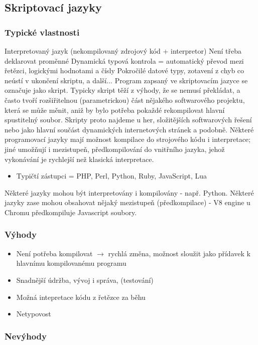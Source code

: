 \documentclass[10pt,a4paper]{article}
\begin{document}
\subsection{Skriptovací jazyky}
\subsubsection{Typické vlastnosti}Interpretovaný jazyk (nekompilovaný zdrojový kód + interpretor)
Není třeba deklarovat proměnné
Dynamická typová kontrola = automatický převod mezi řetězci, logickými hodnotami a čísly
Pokročilé datové typy, zotavení z chyb co neústí v ukončení skriptu, a další...
Program zapsaný ve skriptovacím jazyce se označuje jako skript. Typicky skript těží z výhody, že se nemusí překládat, a často tvoří rozšiřitelnou (parametrickou) část nějakého softwarového projektu, která se může měnit, aniž by bylo potřeba pokaždé rekompilovat hlavní spustitelný soubor. Skripty proto najdeme u her, složitějších softwarových řešení nebo jako hlavní součást dynamických internetových stránek a podobně. Některé programovací jazyky mají možnost kompilace do strojového kódu i interpretace; jiné umožňují i mezistupeň, předkompilování do vnitřního jazyka, jehož vykonávání je rychlejší než klasická interpretace.


\begin{itemize}
\item Typičtí zástupci = PHP, Perl, Python, Ruby, JavaScript, Lua
\end{itemize}

Některé jazyky mohou být interpretovány i kompilovány - např. Python. Některé jazyky zase mohou obsahovat nějaký mezistupeň (předkompilace) - V8 engine u Chromu předkompiluje Javascript soubory.
\subsubsection{Výhody}
\begin{itemize}
\item Není potřeba kompilovat $\rightarrow$ rychlá změna, možnost sloužit jako přídavek k hlavnímu kompilovanému programu
\item Snadnější údržba, vývoj i správa, (testování)
\item Možná intepretace kódu z řetězce za běhu
\item Netypovost
\end{itemize}

\subsubsection{Nevýhody}
\end{document}
